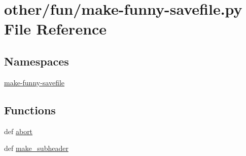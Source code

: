 \hypertarget{make-funny-savefile_8py}{\section{other/fun/make-\/funny-\/savefile.py File Reference}
\label{make-funny-savefile_8py}
}
\subsection*{Namespaces}
\begin{DoxyCompactItemize}
\item 
 \hyperlink{namespacemake-funny-savefile}{make-\/funny-\/savefile}
\end{DoxyCompactItemize}
\subsection*{Functions}
\begin{DoxyCompactItemize}
\item 
def \hyperlink{namespacemake-funny-savefile_a3111c661866968461132c0aca7006f24}{abort}
\item 
def \hyperlink{namespacemake-funny-savefile_aaed87108d49264902998e8dfdc4c2f53}{make\+\_\+subheader}
\end{DoxyCompactItemize}
